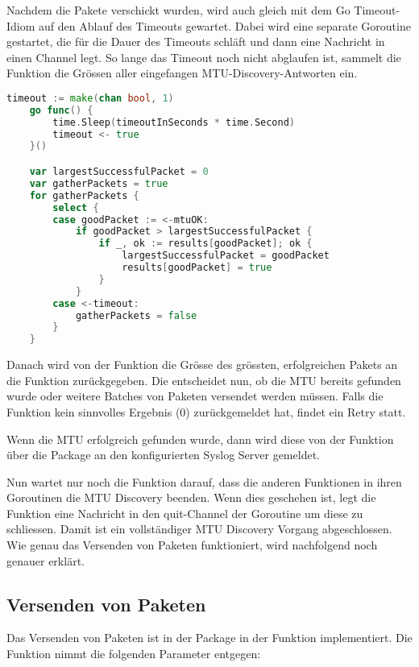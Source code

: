 Nachdem die Pakete verschickt wurden, wird auch gleich mit dem Go Timeout-Idiom auf den Ablauf des Timeouts gewartet. Dabei wird eine separate Goroutine gestartet, die für die Dauer des Timeouts schläft und dann eine Nachricht in einen Channel legt. So lange das Timeout noch nicht abglaufen ist, sammelt die  Funktion die Grössen aller eingefangen MTU-Discovery-Antworten ein.

\begin{lstlisting}[language=go, caption=Antworten einsammeln in mtu.sendBatch(..)]    
	timeout := make(chan bool, 1)
	go func() {
		time.Sleep(timeoutInSeconds * time.Second)
		timeout <- true
	}()

	var largestSuccessfulPacket = 0
	var gatherPackets = true
	for gatherPackets {
		select {
		case goodPacket := <-mtuOK:
			if goodPacket > largestSuccessfulPacket {
				if _, ok := results[goodPacket]; ok {
					largestSuccessfulPacket = goodPacket
					results[goodPacket] = true
				}
			}
		case <-timeout:
			gatherPackets = false
		}
	}
\end{lstlisting}

Danach wird von der  Funktion die Grösse des grössten, erfolgreichen Pakets an die  Funktion zurückgegeben. Die  entscheidet nun, ob die \ac{MTU} bereits gefunden wurde oder weitere Batches von Paketen versendet werden müssen.
Falls die  Funktion kein sinnvolles Ergebnis (0) zurückgemeldet hat, findet ein Retry statt.

Wenn die \ac{MTU} erfolgreich gefunden wurde, dann wird diese von der  Funktion über die  Package an den konfigurierten Syslog Server gemeldet.

Nun wartet nur noch die  Funktion darauf, dass die anderen  Funktionen in ihren Goroutinen die \ac{MTU} Discovery beenden. Wenn dies geschehen ist, legt die  Funktion eine Nachricht in den quit-Channel der  Goroutine um diese zu schliessen. Damit ist ein vollständiger \ac{MTU} Discovery Vorgang abgeschlossen. Wie genau das Versenden von Paketen funktioniert, wird nachfolgend noch genauer erklärt.

\subsection{Versenden von Paketen}
Das Versenden von Paketen ist in der  Package in der  Funktion implementiert. Die  Funktion nimmt die folgenden Parameter entgegen:

